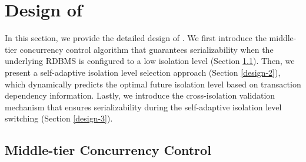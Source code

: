 \section{Design of \sysname}
In this section, we provide the detailed design of \sysname.  We first introduce the middle-tier concurrency control algorithm that guarantees serializability when the underlying RDBMS is configured to a low isolation level (Section \ref{sec:validation-based-cc}). Then, we present a self-adaptive isolation level selection approach (Section \ref{design-2}), which dynamically predicts the optimal future isolation level based on transaction dependency information. Lastly, we introduce the cross-isolation validation mechanism that ensures serializability during the self-adaptive isolation level switching (Section \ref{design-3}). 

\subsection{Middle-tier Concurrency Control \label{design-1}}
\label{sec:validation-based-cc}



